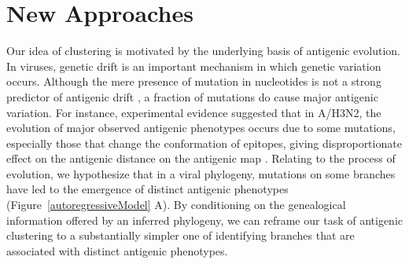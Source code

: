 \documentclass[11pt,oneside,letterpaper]{article}
\begin{document}





\newpage

\section*{New Approaches}




Our idea of clustering is motivated by the underlying basis of antigenic evolution.  
In viruses, genetic drift is an important mechanism in which genetic variation occurs. 
Although the mere presence of mutation in nucleotides is not a strong predictor of antigenic drift \cite{smith_mapping_2004}, a fraction of mutations do cause major antigenic variation. 
For instance, experimental evidence suggested that in A/H3N2, the evolution of major observed antigenic phenotypes occurs due to some mutations, especially those that change the conformation of epitopes, giving disproportionate effect on the antigenic distance on the antigenic map \cite{koel_substitutions_2013}. 
Relating to the process of evolution, we hypothesize that in a viral phylogeny, mutations on some branches have led to the emergence of distinct antigenic phenotypes (Figure~\ref{autoregressiveModel} A).  
By conditioning on the genealogical information offered by an inferred phylogeny, we can reframe our task of antigenic clustering to a substantially simpler one of identifying branches that are associated with distinct antigenic phenotypes.
	
\end{document}
